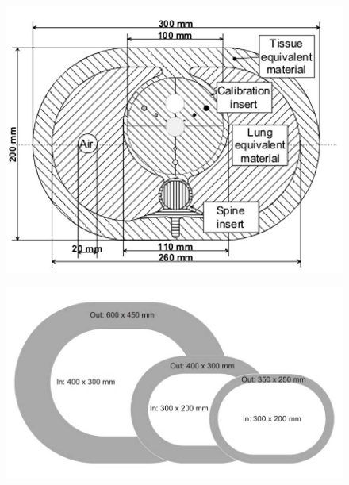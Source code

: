 \begin{figure}[H]
\centering
\begin{minipage}{.5\textwidth}
  \centering
  \includegraphics[width=0.95\linewidth]{./images/cardio_2.jpg}
  \label{fig:QRM_thorax}
\end{minipage}%
\begin{minipage}{.5\textwidth}
  \centering
  \includegraphics[width=0.95\linewidth]{./images/extension_2.jpg}
  \label{fig:QRM_extension}
\end{minipage}
\end{figure}

